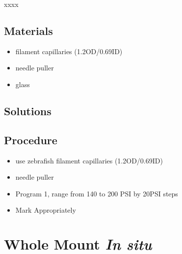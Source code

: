 \documentclass[
  letterpaper,
  DIV=11,
  numbers=noendperiod]{scrreprt}
\providecommand{\tightlist}{%
  \setlength{\itemsep}{0pt}\setlength{\parskip}{0pt}}\usepackage{longtable,booktabs,array}
\begin{document}
\begin{tcolorbox}[enhanced jigsaw, rightrule=.15mm, title=\textcolor{quarto-callout-warning-color}{\faExclamationTriangle}\hspace{0.5em}{NOTES}, titlerule=0mm, opacitybacktitle=0.6, toprule=.15mm, bottomrule=.15mm, opacityback=0, left=2mm, colframe=quarto-callout-warning-color-frame, breakable, coltitle=black, colback=white, colbacktitle=quarto-callout-warning-color!10!white, bottomtitle=1mm, leftrule=.75mm, toptitle=1mm, arc=.35mm]

xxxx

\end{tcolorbox}

\hypertarget{materials-66}{%
\section{Materials}\label{materials-66}}

\begin{itemize}
\tightlist
\item
  filament capillaries (1.2OD/0.69ID)
\item
  needle puller
\item
  glass
\end{itemize}

\hypertarget{solutions-58}{%
\section{Solutions}\label{solutions-58}}

\hypertarget{procedure-65}{%
\section{Procedure}\label{procedure-65}}

\begin{itemize}
\tightlist
\item
  use zebrafish filament capillaries (1.2OD/0.69ID)
\item
  needle puller
\item
  Program 1, range from 140 to 200 PSI by 20PSI steps
\item
  Mark Appropriately
\end{itemize}

\hypertarget{sec-vert_exp-insitu_whole_mount}{%
\chapter{\texorpdfstring{Whole Mount \emph{In
situ}}{Whole Mount In situ}}\label{sec-vert_exp-insitu_whole_mount}}
\end{document}
